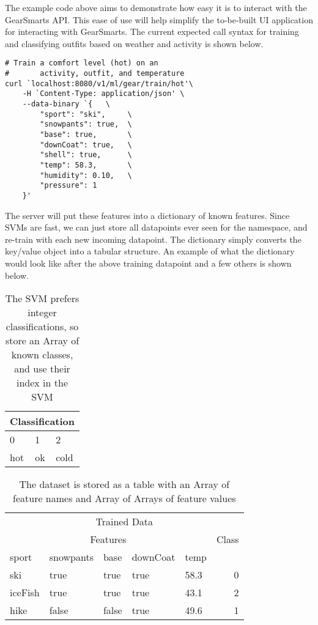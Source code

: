 The example code above aims to demonstrate how easy it is to interact with the GearSmarts API. This ease of use will
help simplify the to-be-built UI application for interacting with GearSmarts. The current expected call syntax for
training and classifying outfits based on weather and activity is shown below.

\begin{lstlisting}
# Train a comfort level (hot) on an
#       activity, outfit, and temperature
curl `localhost:8080/v1/ml/gear/train/hot'\
    -H `Content-Type: application/json' \
    --data-binary `{   \
        "sport": "ski",     \
        "snowpants": true,  \
        "base": true,       \
        "downCoat": true,   \
        "shell": true,      \
        "temp": 58.3,       \
        "humidity": 0.10,   \
        "pressure": 1
    }'
\end{lstlisting}

The server will put these features into a dictionary of known features. Since SVMs are fast, we can just store all
datapoints ever seen for the namespace, and re-train with each new incoming datapoint. The dictionary simply converts
the key/value object into a tabular structure. An example of what the dictionary would look like after the above
training datapoint and a few others is shown below.

\begin{table}
    \begin{tabular}{lll}
        \hline
        \multicolumn{3}{c}{Classification} \\
        \hline
        0 & 1 & 2 \\
        hot & ok & cold \\
        \hline
    \end{tabular}
    \caption{The SVM prefers integer classifications, so store an Array of known classes, and use their index in the SVM}
\end{table}

\begin{table}
    \begin{tabular}{lllllr}
        \hline
        \multicolumn{6}{c}{Trained Data} \\
        \multicolumn{5}{c}{Features} & Class \\
        \hline
        sport   & snowpants & base  & downCoat & temp   \\
        \hline
        \hline
        ski     & true      & true  & true      & 58.3  & 0 \\
        iceFish & true      & true  & true      & 43.1  & 2 \\
        hike    & false     & false & true      & 49.6  & 1 \\
        \hline
    \end{tabular}
    \caption{The dataset is stored as a table with an Array of feature names and Array of Arrays of feature values}
\end{table}


